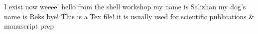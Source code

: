 I exist now weeee!
hello from the shell workshop
my name is Salizhan
my dog's name is Reks
bye!
This is a Tex file!
it is usually used for scientific publications & manuscript prep


